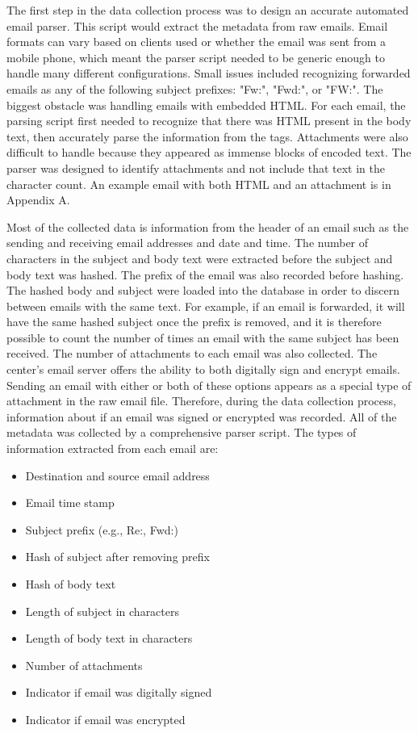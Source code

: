 \documentclass[12pt]{report}
\begin{document}
The first step in the data collection process was to design an accurate automated email parser.
This script would extract the metadata from raw emails.
Email formats can vary based on clients used or whether the email was sent from a mobile phone, which meant the parser script needed to be generic enough to handle many different configurations.
Small issues included recognizing forwarded emails as any of the following subject prefixes: "Fw:", "Fwd:", or "FW:".
The biggest obstacle was handling emails with embedded HTML.
For each email, the parsing script first needed to recognize that there was HTML present in the body text, then accurately parse the information from the tags.
Attachments were also difficult to handle because they appeared as immense blocks of encoded text.
The parser was designed to identify attachments and not include that text in the character count.  
An example email with both HTML and an attachment is in Appendix A.

Most of the collected data is information from the header of an email such as the sending and receiving email addresses and date and time.
The number of characters in the subject and body text were extracted before the subject and body text was hashed.
The prefix of the email was also recorded before hashing.
The hashed body and subject were loaded into the database in order to discern between emails with the same text.
For example, if an email is forwarded, it will have the same hashed subject once the prefix is removed, and it is therefore possible to count the number of times an email with the same subject has been received.
The number of attachments to each email was also collected.
The center's email server offers the ability to both digitally sign and encrypt emails.
Sending an email with either or both of these options appears as a special type of attachment in the raw email file.
Therefore, during the data collection process, information about if an email was signed or encrypted was recorded.  All of the metadata was collected by a comprehensive parser script.  The types of information extracted from each email are:
\begin{itemize}
	\setlength\itemsep{-0.75em}
	  
	\item Destination and source email address    
	\item Email time stamp                        
	\item Subject prefix (e.g., Re:, Fwd:)        
	\item Hash of subject after removing prefix   
	\item Hash of body text                       
	\item Length of subject in characters         
	\item Length of body text in characters       
	\item Number of attachments                   
	\item Indicator if email was digitally signed 
	\item Indicator if email was encrypted        

\end{itemize}
\end{document}
